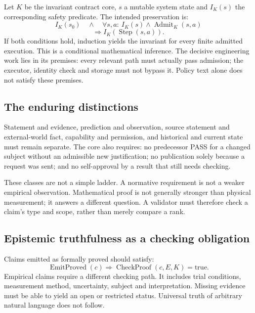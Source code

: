 \begin{cols}
Let $K$ be the invariant contract core, $s$ a mutable system state and $I_K(s)$ the corresponding safety predicate. The intended preservation is:
\[
 I_K(s_0)\quad\land\quad
 \forall s,a:\ I_K(s)\land\operatorname{Admit}_K(s,a)
\]
\[
 \Longrightarrow I_K(\operatorname{Step}(s,a)).
\]
If both conditions hold, induction yields the invariant for every finite admitted execution. This is a conditional mathematical inference. The decisive engineering work lies in its premises: every relevant path must actually pass admission; the executor, identity check and storage must not bypass it. Policy text alone does not satisfy these premises.

\subsection*{The enduring distinctions}
Statement and evidence, prediction and observation, source statement and external-world fact, capability and permission, and historical and current state must remain separate. The core also requires: no predecessor PASS for a changed subject without an admissible new justification; no publication solely because a request was sent; and no self-approval by a result that still needs checking. 

These classes are not a simple ladder. A normative requirement is not a weaker empirical observation. Mathematical proof is not generally stronger than physical measurement; it answers a different question. A validator must therefore check a claim's type and scope, rather than merely compare a rank.

\subsection*{Epistemic truthfulness as a checking obligation}
Claims emitted as formally proved should satisfy:
\[
\operatorname{EmitProved}(c)\Rightarrow
\operatorname{CheckProof}(c,E,K)=\mathrm{true}.
\]
Empirical claims require a different checking path. It includes trial conditions, measurement method, uncertainty, subject and interpretation. Missing evidence must be able to yield an open or restricted status. Universal truth of arbitrary natural language does not follow.


\end{cols}
